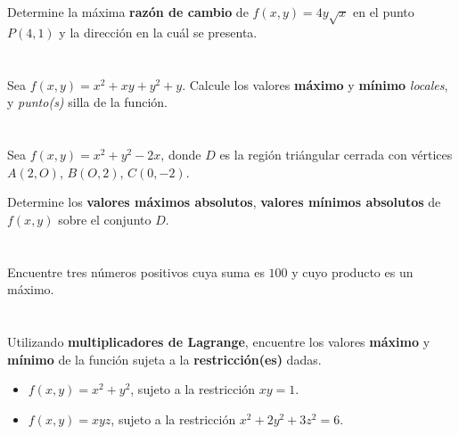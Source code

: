 \documentclass[12pt]{article}
\begin{document}
\section{}

Determine la máxima \textbf{razón de cambio} de $f(x, y) = 4y\sqrt{x}$ en el punto $P(4, 1)$ y la dirección en la cuál se presenta.

\section{}

Sea $f(x, y) = x^2 + xy + y^2 + y$. Calcule los valores \textbf{máximo} y \textbf{mínimo} \textit{locales}, y \textit{punto(s)} silla de la función.

\section{}

Sea $f(x, y) = x^2 + y^2 − 2x$, donde $D$ es la región triángular cerrada con vértices $A(2, O)$, $B(O, 2)$, $C(0, -2)$.

Determine los \textbf{valores máximos absolutos}, \textbf{valores mínimos absolutos} de $f(x, y)$ sobre el conjunto $D$.

\section{}

Encuentre tres números positivos cuya suma es $100$ y cuyo producto es un máximo.

\section{}

Utilizando \textbf{multiplicadores de Lagrange}, encuentre los valores \textbf{máximo} y \textbf{mínimo} de la función sujeta a la \textbf{restricción(es)} dadas.

\begin{itemize}[format=\textbf]

\item $f(x, y) = x^2 + y^2$, sujeto a la restricción $xy = 1$.

\item $f(x, y) = xyz$, sujeto a la restricción $x^2 + 2y^2 + 3z^2 = 6$.
  
\end{itemize}
\end{document}
